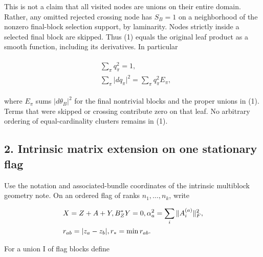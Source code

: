 This is not a claim that all visited nodes are unions on their entire
domain. Rather, any omitted rejected crossing node has \(S_{B}=1\) on a
neighborhood of the nonzero final-block selection support, by
laminarity. Nodes strictly inside a selected final block are skipped.
Thus (1) equals the original leaf product as a smooth function,
including its derivatives. In particular

\begin{gather*}
\begin{aligned}
& \sum _{\pi} q_{\pi}^{2}=1, \\
& \sum _{\pi} \vert d q_{\pi}\vert ^{2} = \sum _{\pi} q_{\pi}^{2} E_{\pi},
\end{aligned}\tag{2}
\end{gather*}

where \(E_{\pi}\) sums \(\vert d \theta _{B}\vert ^{2}\) for the final
nontrivial blocks and the proper unions in (1). Terms that were skipped
or crossing contribute zero on that leaf. No arbitrary ordering of
equal-cardinality clusters remains in (1).

\subsection{2. Intrinsic matrix extension on one stationary
flag}\label{j-intrinsic-matrix-extension-on-one-stationary-flag}

Use the notation and associated-bundle coordinates of the intrinsic
multiblock geometry note. On an ordered flag of ranks
\(n_{1},\ldots ,n_{k}\), write

\begin{gather*}
\begin{aligned}
& X=Z+A+Y, B_{Z}^{*}Y=0, \alpha _{a}^{2}=\sum _{i} \Vert A_{i}^{(a)}\Vert _{F}^{2}, \\
& r_{ab}=\vert z_{a}-z_{b}\vert , r_{*}=\min  r_{ab}.
\end{aligned}\notag
\end{gather*}

For a union I of flag blocks define

